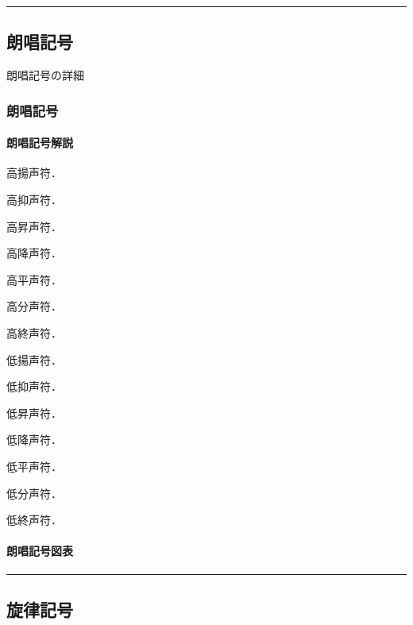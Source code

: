 \documentclass[
  japanese,
]{article}
\providecommand{\tightlist}{%
  \setlength{\itemsep}{0pt}\setlength{\parskip}{0pt}}
\begin{document}
\begin{center}\rule{0.5\linewidth}{0.5pt}\end{center}

\subsection{朗唱記号}\label{chapter3}

朗唱記号の詳細

\subsubsection{朗唱記号}\label{section3.1}

\paragraph{朗唱記号解説}\label{subsection3.1.1}

\begin{description}
\tightlist
\item[{◌́}]
高揚声符．
\item[{◌̀}]
高抑声符．
\item[{◌̂}]
高昇声符．
\item[{◌̌}]
高降声符．
\item[{◌̄}]
高平声符．
\item[{◌̈}]
高分声符．
\item[{◌̇}]
高終声符．
\item[{◌̗}]
低揚声符．
\item[{◌̖}]
低抑声符．
\item[{◌̭}]
低昇声符．
\item[{◌̬}]
低降声符．
\item[{◌̱}]
低平声符．
\item[{◌̤}]
低分声符．
\item[{◌̣}]
低終声符．
\end{description}

\paragraph{朗唱記号図表}\label{subsection3.1.2}

\begin{center}\rule{0.5\linewidth}{0.5pt}\end{center}

\subsection{旋律記号}\label{chapter4}
\end{document}
